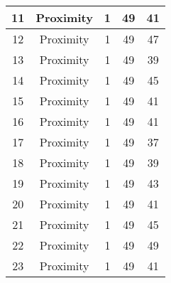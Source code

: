 \documentclass[results.tex]{subfiles}
\begin{document}
\begin{center}
\begin{tabular}{| c || c | c | c | c |}
            \hline
            11                      & Proximity                    & 1                      & 49                      & 41                   \\
            \hline
            12                      & Proximity                    & 1                      & 49                      & 47                   \\
            \hline
            13                      & Proximity                    & 1                      & 49                      & 39                   \\
            \hline
            14                      & Proximity                    & 1                      & 49                      & 45                   \\
            \hline
            15                      & Proximity                    & 1                      & 49                      & 41                   \\
            \hline
            16                      & Proximity                    & 1                      & 49                      & 41                   \\
            \hline
            17                      & Proximity                    & 1                      & 49                      & 37                   \\
            \hline
            18                      & Proximity                    & 1                      & 49                      & 39                   \\
            \hline
            19                      & Proximity                    & 1                      & 49                      & 43                   \\
            \hline
            20                      & Proximity                    & 1                      & 49                      & 41                   \\
            \hline
            21                      & Proximity                    & 1                      & 49                      & 45                   \\
            \hline
            22                      & Proximity                    & 1                      & 49                      & 49                   \\
            \hline
            23                      & Proximity                    & 1                      & 49                      & 41                   \\

\end{tabular}
\end{center}
\end{document}
